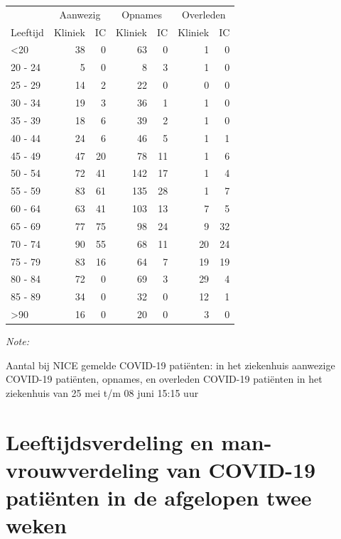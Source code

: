 \documentclass[
  english,
  man,floatsintext]{apa6}
\begin{document}
\begin{table}
\centering\begingroup\fontsize{10}{12}\selectfont

\begin{threeparttable}
\begin{tabular}{lrrrrrr}
\toprule
\multicolumn{1}{c}{ } & \multicolumn{2}{c}{Aanwezig} & \multicolumn{2}{c}{Opnames} & \multicolumn{2}{c}{Overleden} \\
\cmidrule(l{3pt}r{3pt}){2-3} \cmidrule(l{3pt}r{3pt}){4-5} \cmidrule(l{3pt}r{3pt}){6-7}
Leeftijd & Kliniek & IC & Kliniek & IC & Kliniek & IC\\
\midrule
<20 & 38 & 0 & 63 & 0 & 1 & 0\\
20 - 24 & 5 & 0 & 8 & 3 & 1 & 0\\
25 - 29 & 14 & 2 & 22 & 0 & 0 & 0\\
30 - 34 & 19 & 3 & 36 & 1 & 1 & 0\\
35 - 39 & 18 & 6 & 39 & 2 & 1 & 0\\
40 - 44 & 24 & 6 & 46 & 5 & 1 & 1\\
45 - 49 & 47 & 20 & 78 & 11 & 1 & 6\\
50 - 54 & 72 & 41 & 142 & 17 & 1 & 4\\
55 - 59 & 83 & 61 & 135 & 28 & 1 & 7\\
60 - 64 & 63 & 41 & 103 & 13 & 7 & 5\\
65 - 69 & 77 & 75 & 98 & 24 & 9 & 32\\
70 - 74 & 90 & 55 & 68 & 11 & 20 & 24\\
75 - 79 & 83 & 16 & 64 & 7 & 19 & 19\\
80 - 84 & 72 & 0 & 69 & 3 & 29 & 4\\
85 - 89 & 34 & 0 & 32 & 0 & 12 & 1\\
>90 & 16 & 0 & 20 & 0 & 3 & 0\\
\bottomrule
\end{tabular}
\begin{tablenotes}
\item \textit{Note: } 
\item Aantal bij NICE gemelde COVID-19 patiënten: in het ziekenhuis aanwezige COVID-19 patiënten, opnames, en overleden COVID-19 patiënten in het ziekenhuis van 25 mei t/m 08 juni 15:15 uur
\end{tablenotes}
\end{threeparttable}
\endgroup{}
\end{table}

\newpage

\hypertarget{leeftijdsverdeling-en-man-vrouwverdeling-van-covid-19-patiuxebnten-in-de-afgelopen-twee-weken}{%
\section{Leeftijdsverdeling en man-vrouwverdeling van COVID-19 patiënten in de afgelopen twee weken}\label{leeftijdsverdeling-en-man-vrouwverdeling-van-covid-19-patiuxebnten-in-de-afgelopen-twee-weken}}
\end{document}
